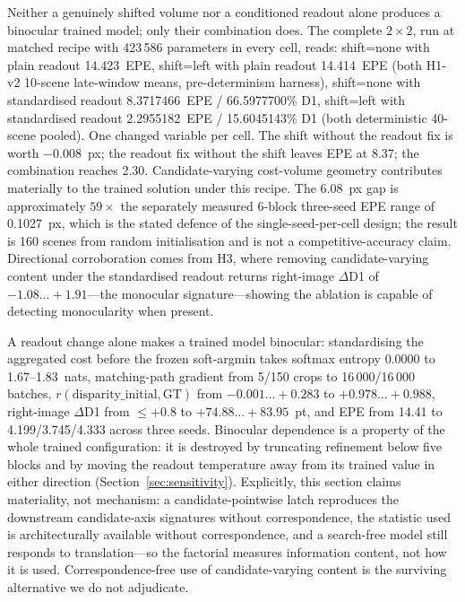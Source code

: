 \documentclass[conference]{IEEEtran}
\begin{document}
Neither a genuinely shifted volume nor a conditioned readout alone produces a binocular trained model; only their combination does. The complete $2\times2$, run at matched recipe with 423\,586 parameters in every cell, reads: shift=none with plain readout 14.423~EPE, shift=left with plain readout 14.414~EPE (both H1-v2 10-scene late-window means, pre-determinism harness), shift=none with standardised readout 8.3717466~EPE / 66.5977700\% D1, shift=left with standardised readout 2.2955182~EPE / 15.6045143\% D1 (both deterministic 40-scene pooled). One changed variable per cell. The shift without the readout fix is worth $-0.008$~px; the readout fix without the shift leaves EPE at 8.37; the combination reaches 2.30. Candidate-varying cost-volume geometry contributes materially to the trained solution under this recipe. The 6.08~px gap is approximately $59\times$ the separately measured 6-block three-seed EPE range of 0.1027~px, which is the stated defence of the single-seed-per-cell design; the result is 160 scenes from random initialisation and is not a competitive-accuracy claim. Directional corroboration comes from H3, where removing candidate-varying content under the standardised readout returns right-image $\Delta$D1 of $-1.08\ldots+1.91$---the monocular signature---showing the ablation is capable of detecting monocularity when present.

A readout change alone makes a trained model binocular: standardising the aggregated cost before the frozen soft-argmin takes softmax entropy 0.0000 to 1.67--1.83~nats, matching-path gradient from 5/150 crops to 16\,000/16\,000 batches, $r(\mathrm{disparity\_initial},\mathrm{GT})$ from $-0.001\ldots+0.283$ to $+0.978\ldots+0.988$, right-image $\Delta$D1 from $\le+0.8$ to $+74.88\ldots+83.95$~pt, and EPE from 14.41 to 4.199/3.745/4.333 across three seeds. Binocular dependence is a property of the whole trained configuration: it is destroyed by truncating refinement below five blocks and by moving the readout temperature away from its trained value in either direction (Section~\ref{sec:sensitivity}). Explicitly, this section claims materiality, not mechanism: a candidate-pointwise latch reproduces the downstream candidate-axis signatures without correspondence, the statistic used is architecturally available without correspondence, and a search-free model still responds to translation---so the factorial measures information content, not how it is used. Correspondence-free use of candidate-varying content is the surviving alternative we do not adjudicate.
\end{document}
